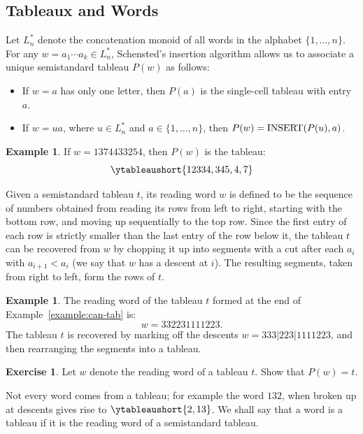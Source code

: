 \documentclass[11pt]{amsart}
\theoremstyle{definition}
\theoremstyle{example}
\newtheorem{example}[theorem]{Example}
\newtheorem{exercise}[theorem]{Exercise}
\newcommand{\ins}{\textup{INSERT}}
\begin{document}
\subsection{Tableaux and Words}
\label{sec:tabl-assoc-word}
Let $L^*_n$ denote the concatenation monoid of all words in the alphabet $\{1,\dotsc,n\}$.
For any $w=a_1\dotsb a_k\in L^*_n$, Schensted's insertion algorithm allows us to associate a unique semistandard tableau $P(w)$ as follows:
\begin{itemize}
\item If $w=a$ has only one letter, then $P(a)$ is the single-cell tableau with entry $a$.
\item If $w=ua$, where $u\in L_n^*$ and $a\in \{1,\dotsc,n\}$, then \linebreak $P(w)=\ins(P(u), a)$.
\end{itemize}
\begin{example}
  If $w=1374433254$, then $P(w)$ is the tableau:
  \begin{displaymath}
    \ytableaushort{12334,345,4,7}
  \end{displaymath}
\end{example}
\label{sec:tableau-as-words}
Given a semistandard tableau $t$, its reading word $w$ is defined to be the sequence of numbers obtained from reading its rows from left to right, starting with the bottom row, and moving up sequentially to the top row.
Since the first entry of each row is strictly smaller than the last entry of the row below it, the tableau $t$ can be recovered from $w$ by chopping it up into segments with a cut after each $a_i$ with $a_{i+1}<a_i$ (we say that $w$ has a descent at $i$). The resulting segments, taken from right to left, form the rows of $t$.
\begin{example}
  The reading word of the tableau $t$ formed at the end of Example~\ref{example:can-tab} is:
  \begin{displaymath}
    w = 332231111223.
  \end{displaymath}
  The tableau $t$ is recovered by marking off the descents $w = 333|223|1111223$, and then rearranging the segments into a tableau.
\end{example}
\begin{exercise}
  \label{exercise:tableau-word}
  Let $w$ denote the reading word of a tableau $t$.
  Show that $P(w)=t$.
\end{exercise}
Not every word comes from a tableau; for example the word $132$, when broken up at descents gives rise to $\ytableaushort{2,13}$.
We shall say that a word is a tableau if it is the reading word of a semistandard tableau.
\end{document}

